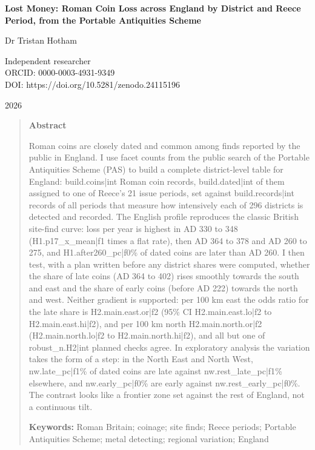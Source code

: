 \documentclass[11pt,a4paper]{article}
\begin{document}
\begin{center}
{\Large\bfseries Lost Money: Roman Coin Loss across England by District and Reece Period, from the Portable Antiquities Scheme\par}
\vspace{1.2em}
{\large Dr Tristan Hotham\par}
\vspace{0.3em}
{\small Independent researcher\\
ORCID: 0000-0003-4931-9349\\
DOI: https://doi.org/10.5281/zenodo.24115196\par}
\vspace{0.8em}
2026
\end{center}

\begin{quote}
\small
\begin{center}\textbf{Abstract}\end{center}
Roman coins are closely dated and common among finds reported by the public in England. I use facet counts from the public search of the Portable Antiquities Scheme (PAS) to build a complete district-level table for England: {{build.coins|int}} Roman coin records, {{build.dated|int}} of them assigned to one of Reece's 21 issue periods, set against {{build.records|int}} records of all periods that measure how intensively each of 296 districts is detected and recorded. The English profile reproduces the classic British site-find curve: loss per year is highest in AD 330 to 348 ({{H1.p17_x_mean|f1}} times a flat rate), then AD 364 to 378 and AD 260 to 275, and {{H1.after260_pc|f0}}\% of dated coins are later than AD 260. I then test, with a plan written before any district shares were computed, whether the share of late coins (AD 364 to 402) rises smoothly towards the south and east and the share of early coins (before AD 222) towards the north and west. Neither gradient is supported: per 100 km east the odds ratio for the late share is {{H2.main.east.or|f2}} (95\% CI {{H2.main.east.lo|f2}} to {{H2.main.east.hi|f2}}), and per 100 km north {{H2.main.north.or|f2}} ({{H2.main.north.lo|f2}} to {{H2.main.north.hi|f2}}), and all but one of {{robust_n.H2|int}} planned checks agree. In exploratory analysis the variation takes the form of a step: in the North East and North West, {{nw.late_pc|f1}}\% of dated coins are late against {{nw.rest_late_pc|f1}}\% elsewhere, and {{nw.early_pc|f0}}\% are early against {{nw.rest_early_pc|f0}}\%. The contrast looks like a frontier zone set against the rest of England, not a continuous tilt.

\textbf{Keywords:} Roman Britain; coinage; site finds; Reece periods; Portable Antiquities Scheme; metal detecting; regional variation; England
\end{quote}
\end{document}
